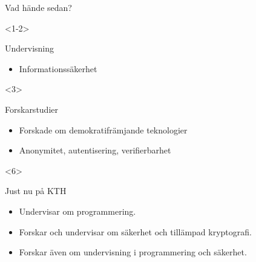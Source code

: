 \begin{frame}
  \begin{block}{Vad hände sedan?}
  \end{block}

  \begin{onlyenv}<1-2>
    \begin{exampleblock}{Undervisning }
      \begin{itemize}
        \item Informationssäkerhet
      \end{itemize}
    \end{exampleblock}
  \end{onlyenv}
  \begin{onlyenv}<3>
    \begin{exampleblock}{Forskarstudier}
      \begin{itemize}
        \item Forskade om demokratifrämjande teknologier
        \item Anonymitet, autentisering, verifierbarhet
      \end{itemize}
    \end{exampleblock}
  \end{onlyenv}
  \begin{onlyenv}<6>
    \begin{exampleblock}{Just nu på KTH}
      \begin{itemize}
        \item Undervisar om programmering.
        \item Forskar och undervisar om säkerhet och tillämpad kryptografi.
        \item Forskar även om undervisning i programmering och säkerhet.

\end{itemize}
\end{exampleblock}
\end{onlyenv}
\end{frame}
